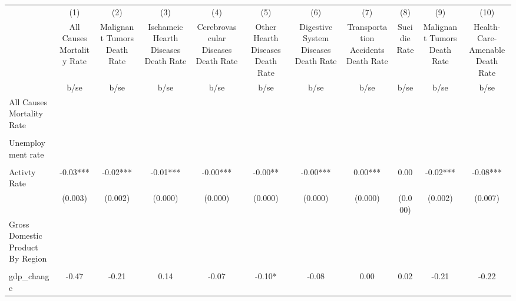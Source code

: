 {
\def\sym#1{\ifmmode^{#1}\else\(^{#1}\)\fi}
\begin{tabular}{l*{10}{c}}
\hline\hline
                    &\multicolumn{1}{c}{(1)}&\multicolumn{1}{c}{(2)}&\multicolumn{1}{c}{(3)}&\multicolumn{1}{c}{(4)}&\multicolumn{1}{c}{(5)}&\multicolumn{1}{c}{(6)}&\multicolumn{1}{c}{(7)}&\multicolumn{1}{c}{(8)}&\multicolumn{1}{c}{(9)}&\multicolumn{1}{c}{(10)}\\
                    &\multicolumn{1}{c}{All Causes Mortality Rate}&\multicolumn{1}{c}{Malignant Tumors Death Rate}&\multicolumn{1}{c}{Ischameic Hearth Diseases Death Rate}&\multicolumn{1}{c}{Cerebrovascular Diseases Death Rate}&\multicolumn{1}{c}{Other Hearth Diseases Death Rate}&\multicolumn{1}{c}{Digestive System Diseases Death Rate}&\multicolumn{1}{c}{Transportation Accidents Death Rate}&\multicolumn{1}{c}{Sucidie Rate}&\multicolumn{1}{c}{Malignant Tumors Death Rate}&\multicolumn{1}{c}{Health-Care-Amenable Death Rate}\\
                    &  b/se   &  b/se   &  b/se   &  b/se   &  b/se   &  b/se   &  b/se   &  b/se   &  b/se   &  b/se   \\
\hline
All Causes Mortality Rate&         &         &         &         &         &         &         &         &         &         \\
                    &         &         &         &         &         &         &         &         &         &         \\
Unemployment rate   &         &         &         &         &         &         &         &         &         &         \\
                    &         &         &         &         &         &         &         &         &         &         \\
Activty Rate        & -0.03***& -0.02***& -0.01***& -0.00***& -0.00** & -0.00***&  0.00***&  0.00   & -0.02***& -0.08***\\
                    &(0.003)   &(0.002)   &(0.000)   &(0.000)   &(0.000)   &(0.000)   &(0.000)   &(0.000)   &(0.002)   &(0.007)   \\
Gross Domestic Product By Region&         &         &         &         &         &         &         &         &         &         \\
                    &         &         &         &         &         &         &         &         &         &         \\
gdp\_change          & -0.47   & -0.21   &  0.14   & -0.07   & -0.10*  & -0.08   &  0.00   &  0.02   & -0.21   & -0.22   \\

\end{tabular}}
